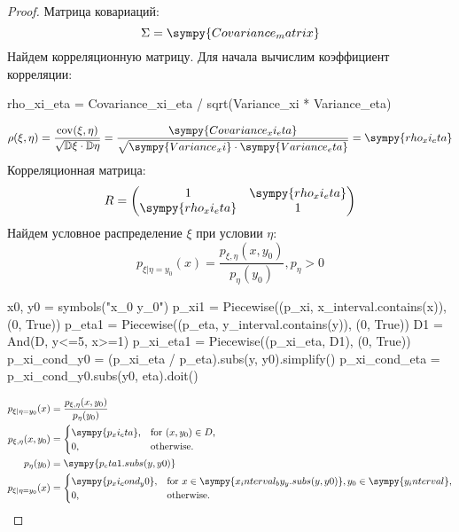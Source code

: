 \begin{proof}
    Матрица ковариаций:
    \[
        \Sigma = \sympy{Covariance_matrix}
    \]
    Найдем корреляционную матрицу. Для начала вычислим коэффициент корреляции:
    \begin{sympycode}
rho_xi_eta = Covariance_xi_eta / sqrt(Variance_xi * Variance_eta)
    \end{sympycode}
    \[
        \rho(\xi,\eta) = \frac{\cov(\xi,\eta)}{\sqrt{\Variance \xi \cdot \Variance \eta}}
        = \frac{\sympy{Covariance_xi_eta}}{\sqrt{\sympy{Variance_xi} \cdot \sympy{Variance_eta}} }
        = \sympy{rho_xi_eta}
    \]
    Корреляционная матрица:
    \[
        R = \begin{pmatrix}
            1                  & \sympy{rho_xi_eta} \\
            \sympy{rho_xi_eta} & 1
        \end{pmatrix}
    \]
    Найдем условное распределение $\xi$ при условии $\eta$:
    \[
        p_{\xi|\eta=y_0}(x) = \frac{p_{\xi, \eta}(x, y_0)}{p_\eta (y_0)}, p_\eta > 0
    \]
    \begin{sympycode}
x0, y0 = symbols("x_0 y_0")
p_xi1 = Piecewise((p_xi,  x_interval.contains(x)), (0, True))
p_eta1 = Piecewise((p_eta, y_interval.contains(y)), (0, True))
D1 = And(D, y<=5, x>=1)
p_xi_eta1 = Piecewise((p_xi_eta, D1), (0, True))
p_xi_cond_y0 = (p_xi_eta / p_eta).subs(y, y0).simplify()
p_xi_cond_eta = p_xi_cond_y0.subs(y0, eta).doit()
    \end{sympycode}
    \[
        \begin{aligned}
            p_{\xi|\eta=y_0}(x)
             & = \frac{p_{\xi, \eta}(x, y_0)}{{p_\eta (y_0)}}
            \\
            p_{\xi, \eta}(x, y_0)
             & = \begin{cases}
                     \sympy{p_xi_eta}, & \text{for } (x, y_0) \in D, \\
                     0,                & \text{otherwise}.
                 \end{cases}
            \\
            p_\eta(y_0)
             & = \sympy{p_eta1.subs(y, y0)}
            \\
            p_{\xi|\eta=y_0}(x)
             & = \begin{cases}
                     \sympy{p_xi_cond_y0}, & \text{for } x \in \sympy{x_interval_by_y.subs(y, y0)}, y_0 \in \sympy{y_interval}, \\
                     0,                    & \text{otherwise}.
                 \end{cases}

\end{aligned}\]
\end{proof}

